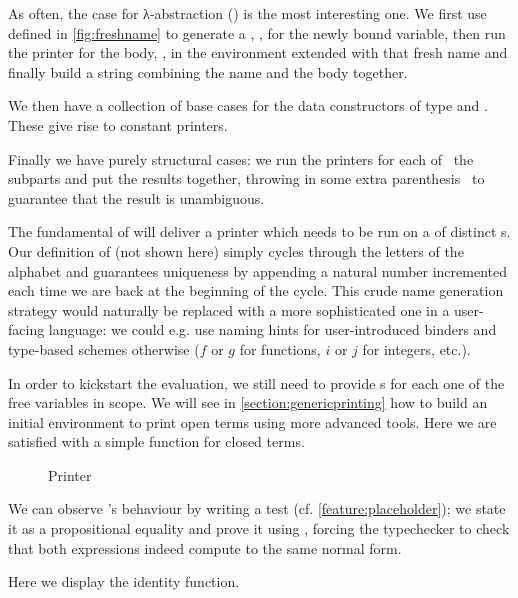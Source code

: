 As often, the case for λ-abstraction () is the most interesting one.
We first use  defined in \cref{fig:freshname} to generate a ,
, for the newly bound variable, then run the printer for the body, ,
in the environment extended with that fresh name and finally build a string
combining the name and the body together.


We then have a collection of base cases for the data constructors of type
 and . These give rise to constant printers.


Finally we have purely structural cases: we run the printers for each of~
the subparts and put the results together, throwing in some extra parenthesis~
to guarantee that the result is unambiguous.



The fundamental  of  will deliver a printer which needs to be run
on a  of distinct s. Our definition of  (not
shown here) simply cycles through the letters of the alphabet and guarantees
uniqueness by appending a natural number incremented each time we are back at
the beginning of the cycle. This crude name generation strategy would naturally
be replaced with a more sophisticated one in a user-facing language: we could
e.g. use naming hints for user-introduced binders and type-based schemes otherwise
($f$ or $g$ for functions, $i$ or $j$ for integers, etc.).

In order to kickstart the evaluation, we still need to provide s for each
one of the free variables in scope. We will see in \cref{section:genericprinting}
how to build an initial environment to print open terms using more advanced tools.
Here we are satisfied with a simple  function for closed terms.

\begin{figure}[h]
\caption{Printer\label{fig:printer}}
\end{figure}

We can observe 's behaviour by writing a test
(cf. \cref{feature:placeholder}); we state it as a
propositional equality and prove it using , forcing the typechecker
to check that both expressions indeed compute to the same normal form.

\begin{example}
\label{fig:printtest}
Here we display the identity function.

\end{example}
